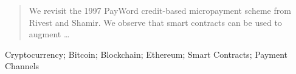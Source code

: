 
\begin{abstract}

We revisit the 1997 PayWord credit-based micropayment scheme from Rivest and Shamir. We observe that smart contracts can be used to augment \ldots 


\end{abstract}

\begin{IEEEkeywords}
Cryptocurrency; Bitcoin; Blockchain; Ethereum; Smart Contracts; Payment Channels
\end{IEEEkeywords}
